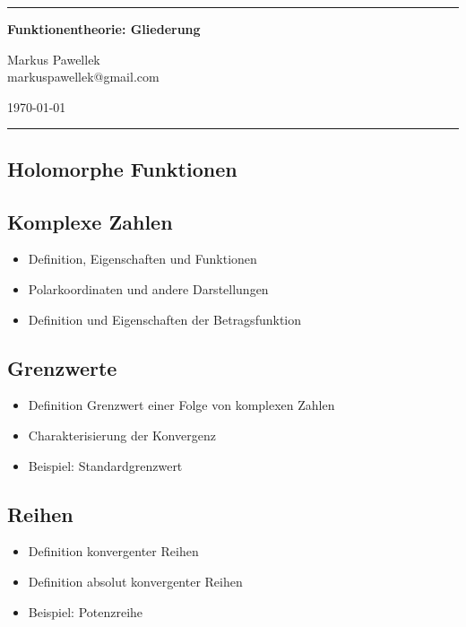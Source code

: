 \documentclass[8pt,a4paper,fleqn]{article}
\begin{document}
  \hrule
  \begin{center}
  \huge \textbf{Funktionentheorie: Gliederung}
  \end{center}
  \bigskip
  {\large \begin{minipage}[c]{0.4\textwidth}\flushleft Markus Pawellek \\ markuspawellek@gmail.com\end{minipage} \hfill \begin{minipage}[c]{0.4\textwidth}\flushright\today\end{minipage}}
  \medskip
  \hrule
  \bigskip

  \begin{multicols}{2}
  \section{Holomorphe Funktionen} %
  \label{sec:holomorphe_funktionen}

  \subsection{Komplexe Zahlen} %
  \label{sub:komplexe_zahlen}
  \begin{itemize}
    \item Definition, Eigenschaften und Funktionen
    \item Polarkoordinaten und andere Darstellungen
    \item Definition und Eigenschaften der Betragsfunktion
  \end{itemize}

  \subsection{Grenzwerte} %
  \label{sub:grenzwerte}
  \begin{itemize}
    \item Definition Grenzwert einer Folge von komplexen Zahlen
    \item Charakterisierung der Konvergenz
    \item Beispiel: Standardgrenzwert
  \end{itemize}

  \subsection{Reihen} %
  \label{sub:reihen}
  \begin{itemize}
    \item Definition konvergenter Reihen
    \item Definition absolut konvergenter Reihen
    \item Beispiel: Potenzreihe
  \end{itemize}


\end{multicols}
\end{document}
